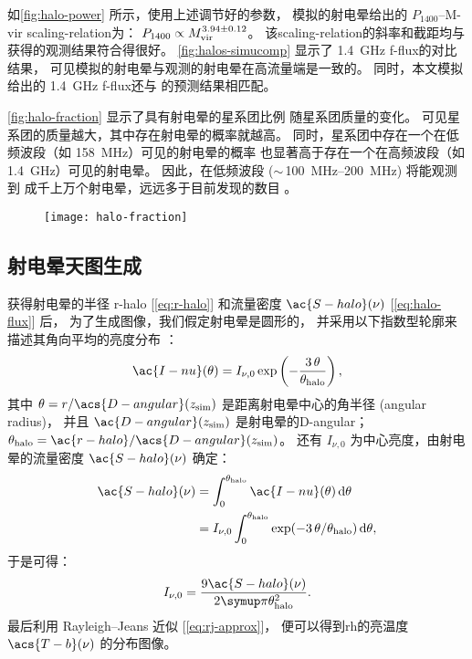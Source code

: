 如\autoref{fig:halo-power} 所示，使用上述调节好的参数，
模拟的射电晕给出的 $P_{1400}$--\ac{M-vir} \ac{scaling-relation}为：
$P_{1400} \propto M_{\mathrm{vir}}^{3.94 \pm 0.12}$。
该\ac{scaling-relation}的斜率和截距均与 
获得的观测结果符合得很好。
\autoref{fig:halos-simucomp} 显示了 \SI{1.4}{\GHz} \ac{f-flux}的对比结果，
可见模拟的射电晕与观测的射电晕在高流量端是一致的。
同时，本文模拟给出的 \SI{1.4}{\GHz} \ac{f-flux}还与
 的预测结果相匹配。

\autoref{fig:halo-fraction} 显示了具有射电晕的星系团比例
随星系团质量的变化。
可见星系团的质量越大，其中存在射电晕的概率就越高。
同时，星系团中存在一个在低频波段（如 \SI{158}{\MHz}）可见的射电晕的概率
也显著高于存在一个在高频波段（如 \SI{1.4}{\GHz}）可见的射电晕。
因此，在低频波段 ($\sim$\,\SIrange{100}{200}{\MHz}) 将能观测到
成千上万个射电晕，远远多于目前发现的数目 \cite{cassano2012,cassano2015}。

\begin{figure}[htp]
  \centering
  \texttt{[image: halo-fraction]}
  \label{fig:halo-fraction}
\end{figure}

\subsection{射电晕天图生成}
\label{sec:halo-maps}

获得射电晕的半径 \ac{r-halo} [\autoref{eq:r-halo}]
和流量密度 $\ac{S-halo}(\nu)$ [\autoref{eq:halo-flux}] 后，
为了生成图像，我们假定射电晕是圆形的，
并采用以下指数型轮廓来描述其角向平均的亮度分布 \cite{murgia2009}：
\begin{equation}
  \label{eq:halo-profile}
  \ac{I-nu}(\theta) =
    I_{\nu,0} \exp\left( -\frac{3\,\theta}{\theta_{\R{halo}}} \right) ,
\end{equation}
其中
$\theta = r / \acs{D-angular}(z_{\R{sim}})$ 是距离射电晕中心的角半径
(angular radius)，
并且 $\ac{D-angular}(z_{\R{sim}})$ 是射电晕的\acl{D-angular}；
$\theta_{\R{halo}} = \ac{r-halo} / \acs{D-angular}(z_{\R{sim}})$。
还有 $I_{\nu,0}$ 为中心亮度，由射电晕的流量密度 $\ac{S-halo}(\nu)$ 确定：
\begin{align}
  \ac{S-halo}(\nu)
    & = \int_0^{\theta_{\R{halo}}} \ac{I-nu}(\theta) \,\D{\theta} \\
    & = I_{\nu,0} \int_0^{\theta_{\R{halo}}}
        \exp( -3\,\theta / \theta_{\R{halo}} ) \,\D{\theta} ,
\end{align}
于是可得：
\begin{equation}
  I_{\nu,0} = \frac{9 \ac{S-halo}(\nu)}{2\Cpi \theta^2_{\R{halo}}} .
\end{equation}
最后利用 Rayleigh--Jeans 近似 [\autoref{eq:rj-approx}]，
便可以得到\ac{rh}的亮温度 $\acs{T-b}(\nu)$ 的分布图像。

